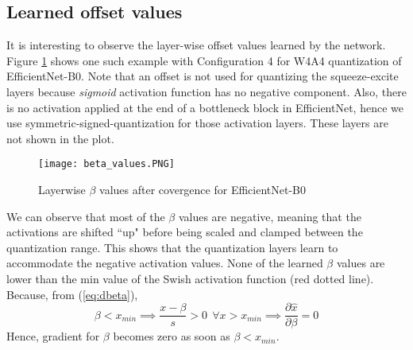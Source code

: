 \documentclass[10pt,twocolumn,letterpaper]{article}
\begin{document}
\subsection{Learned offset values}
It is interesting to observe the layer-wise offset values learned by the network. 
Figure \ref{fig:layerwise_beta} shows one such example with Configuration 4 for W4A4 quantization of EfficientNet-B0. Note that an offset is not used for quantizing the squeeze-excite layers because \textit{sigmoid} activation function has no negative component. Also, there is no activation applied at the end of a bottleneck block in EfficientNet, hence we use symmetric-signed-quantization for those activation layers. These layers are not shown in the plot.
\begin{figure}[h]
    \centering
    \texttt{[image: beta\_values.PNG]}
    \caption{Layerwise $\beta$ values after covergence for EfficientNet-B0 }
    \label{fig:layerwise_beta}
\end{figure}

We can observe that most of the $\beta$ values are negative, meaning that the activations are shifted ``up" before being scaled and clamped between the quantization range. This shows that the quantization layers learn to accommodate the negative activation values. None of the learned $\beta$ values are lower than the min value of the Swish activation function (red dotted line). Because, from (\ref{eq:dbeta}), $$\beta<x_{min}\implies\frac{x-\beta}{s}>0 \;\,\forall x>x_{min} \implies \frac{\partial \hat{x}}{\partial \beta} =0$$
Hence, gradient for $\beta$ becomes zero as soon as $\beta<x_{min}$.
\end{document}
